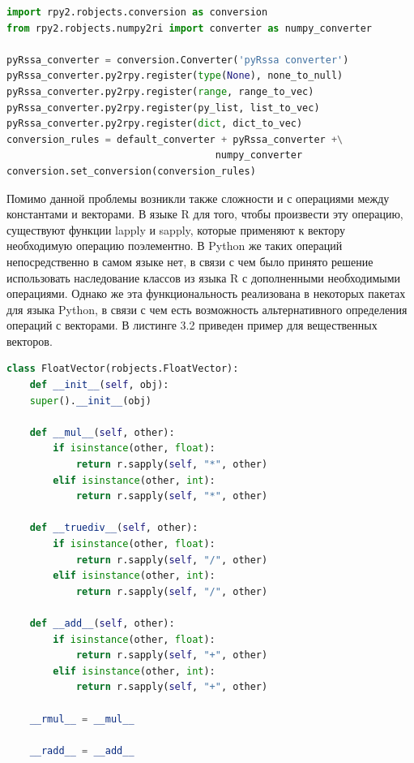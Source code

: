 \documentclass[specialist,
			   substylefile = spbu_report.rtx,
			   subf,href,colorlinks=true, 12pt]{disser}
\begin{document}
\noindent
\begin{minipage}{\linewidth}
\begin{lstlisting}[language=Python, caption=Конвертация из Python в R.]
import rpy2.robjects.conversion as conversion
from rpy2.robjects.numpy2ri import converter as numpy_converter

pyRssa_converter = conversion.Converter('pyRssa converter')
pyRssa_converter.py2rpy.register(type(None), none_to_null)
pyRssa_converter.py2rpy.register(range, range_to_vec)
pyRssa_converter.py2rpy.register(py_list, list_to_vec)
pyRssa_converter.py2rpy.register(dict, dict_to_vec)
conversion_rules = default_converter + pyRssa_converter +\
                                    numpy_converter
conversion.set_conversion(conversion_rules)
\end{lstlisting}
\end{minipage}

Помимо данной проблемы возникли также сложности и с операциями между константами и векторами. В языке R для того, чтобы произвести эту операцию, существуют функции lapply и sapply, которые применяют к вектору необходимую операцию поэлементно. В Python же таких операций непосредственно в самом языке нет, в связи с чем было принято решение использовать наследование классов из языка R с дополненными необходимыми операциями. Однако же эта функциональность реализована в некоторых пакетах \cite{habr-doc} для языка Python, в связи с чем есть возможность альтернативного определения операций с векторами. В листинге 3.2 приведен пример для вещественных векторов.

\begin{lstlisting}[language=Python, caption=Наследование для FloatVector.]
class FloatVector(robjects.FloatVector):
	def __init__(self, obj):
	super().__init__(obj)
	
	def __mul__(self, other):
		if isinstance(other, float):
			return r.sapply(self, "*", other)
		elif isinstance(other, int):
			return r.sapply(self, "*", other)
	
	def __truediv__(self, other):
		if isinstance(other, float):
			return r.sapply(self, "/", other)
		elif isinstance(other, int):
			return r.sapply(self, "/", other)
	
	def __add__(self, other):
		if isinstance(other, float):
			return r.sapply(self, "+", other)
		elif isinstance(other, int):
			return r.sapply(self, "+", other)
	
	__rmul__ = __mul__
	
	__radd__ = __add__
\end{lstlisting}
\end{document}
